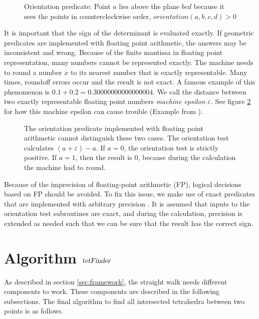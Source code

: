 \documentclass[../thesis.tex]{subfiles}
\begin{document}
\begin{figure}[htb]
  \centering
  \def\svgwidth{20em}
  
  \caption{Orientation predicate: Point $a$ lies above the plane $bcd$ because it sees the points in counterclockwise order, $orientation(a,b,c,d)>0$}
  \label{fig:orient2d}
\end{figure}
It is important that the sign of the determinant is evaluated exactly.
If geometric predicates are implemented with floating point arithmetic,
the answers may be inconsistent and wrong.
Because of the finite mantissa in floating point representation, many numbers cannot be represented exactly.
The machine needs to round a number $x$ to its nearest number that is exactly representable.
Many times, roundoff errors occur and the result is not exact. A famous example of this phenomenon is $0.1 + 0.2 = 0.30000000000000004$.
We call the distance between two exactly representable floating point numbers \emph{machine epsilon} $\varepsilon$.
See figure \ref{fig:floatingpoint} for how this machine epsilon can cause trouble (Example from \cite{Marek}).
\begin{figure}[htb]
  \centering
  \def\svgwidth{20em}
  
  \caption{The orientation predicate implemented with floating point arithmetic cannot distinguish these two cases.
  The orientation test calculates $(a+\varepsilon)-a$. If $a=0$, the orientation test is strictly positive.
  If $a=1$, then the result is $0$, because during the calculation the machine had to round.
  }\label{fig:floatingpoint}
\end{figure}
Because of the imprecision of floating-point arithmetic (FP), logical decisions
based on FP should be avoided.
To fix this issue, we make use of exact predicates that are implemented with arbitrary precision \cite{RichardShewchuk1997}.
It is assumed that inputs to the orientation test subroutines are exact, and during the calculation,
precision is extended as needed such that
we can be sure that the result has the correct sign.


\section{Algorithm $\textsl{tetFinder}$}
As described in section \ref{sec:framework}, the straight walk needs different
components to work. These components are described in the following subsections.
The final algorithm to find all intersected tetrahedra between two points is as follows.
\end{document}
